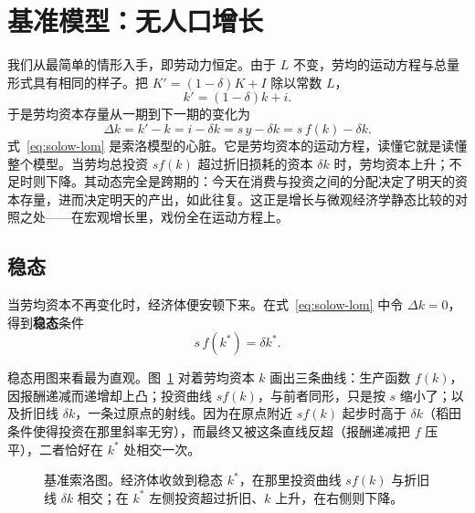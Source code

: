 \section{基准模型：无人口增长}

我们从最简单的情形入手，即劳动力恒定。由于 $L$ 不变，劳均的运动方程与总量形式具有相同的样子。把 $K' = (1-\delta)K + I$ 除以常数 $L$，
\[
k' = (1-\delta) k + i.
\]
于是劳均资本存量从一期到下一期的变化为
\begin{equation}
\Delta k = k' - k = i - \delta k = s\, y - \delta k = s\, f(k) - \delta k.
\label{eq:solow-lom}
\end{equation}
式~\eqref{eq:solow-lom} 是索洛模型的心脏。它是劳均资本的运动方程，读懂它就是读懂整个模型。当劳均总投资 $s f(k)$ 超过折旧损耗的资本 $\delta k$ 时，劳均资本上升；不足时则下降。其动态完全是跨期的：今天在消费与投资之间的分配决定了明天的资本存量，进而决定明天的产出，如此往复。这正是增长与微观经济学静态比较的对照之处——在宏观增长里，戏份全在运动方程上。

\subsection{稳态}

当劳均资本不再变化时，经济体便安顿下来。在式~\eqref{eq:solow-lom} 中令 $\Delta k = 0$，得到\textbf{稳态}条件
\begin{equation}
s\, f(k^*) = \delta k^*.
\label{eq:solow-ss}
\end{equation}


稳态用图来看最为直观。图~\ref{fig:macro-2} 对着劳均资本 $k$ 画出三条曲线：生产函数 $f(k)$，因报酬递减而递增却上凸；投资曲线 $s f(k)$，与前者同形，只是按 $s$ 缩小了；以及折旧线 $\delta k$，一条过原点的射线。因为在原点附近 $s f(k)$ 起步时高于 $\delta k$（稻田条件使得投资在那里斜率无穷），而最终又被这条直线反超（报酬递减把 $f$ 压平），二者恰好在 $k^*$ 处相交一次。

\begin{figure}[h]
\centering

\caption{基准索洛图。经济体收敛到稳态 $k^*$，在那里投资曲线 $s f(k)$ 与折旧线 $\delta k$ 相交；在 $k^*$ 左侧投资超过折旧、$k$ 上升，在右侧则下降。}
\label{fig:macro-2}
\end{figure}

